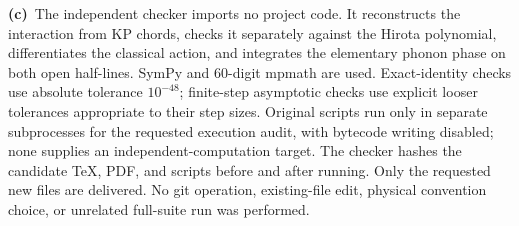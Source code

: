 \documentclass[11pt,a4paper]{article}
\newcommand{\Lc}{\textbf{(c)}\ }
\begin{document}
\Lc The independent checker imports no project code. It reconstructs the
interaction from KP chords, checks it separately against the Hirota polynomial,
differentiates the classical action, and integrates the elementary phonon
phase on both open half-lines. SymPy and 60-digit mpmath are used. Exact-identity
checks use absolute tolerance $10^{-48}$; finite-step asymptotic checks use
explicit looser tolerances appropriate to their step sizes. Original scripts
run only in separate subprocesses for the requested execution audit, with
bytecode writing disabled; none supplies an independent-computation target.
The checker hashes the candidate TeX, PDF, and scripts before and after running.
Only the requested new files are delivered. No git operation, existing-file
edit, physical convention choice, or unrelated full-suite run was performed.

\clearpage
\end{document}
